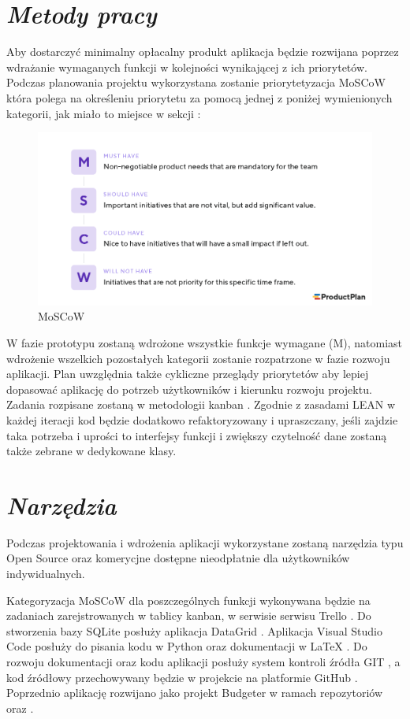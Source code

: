 \documentclass[a4paper,10pt, twoside]{report}
\newcommand{\customstylesection}[1]{\textbf{\textit{#1}}}
\begin{document}
\section{\customstylesection{Metody pracy}}
{Aby dostarczyć minimalny opłacalny produkt \cite{MVP} aplikacja będzie 
rozwijana poprzez wdrażanie wymaganych funkcji w kolejności wynikającej 
z ich priorytetów. Podczas planowania projektu wykorzystana zostanie 
priorytetyzacja MoSCoW \cite{MOSCOW} która polega na określeniu priorytetu za 
pomocą jednej z poniżej wymienionych kategorii, jak miało to miejsce w sekcji 
:
\begin{figure}[H]           %
    \caption{MoSCoW}
    \label{fig:MoSCoW}
    \centering  
    \includegraphics[width=12cm]{figures/MoSCoW-01.png}
\end{figure}
W fazie prototypu zostaną wdrożone wszystkie funkcje wymagane (M), 
natomiast wdrożenie wszelkich pozostałych kategorii zostanie rozpatrzone w fazie
 rozwoju aplikacji. Plan uwzględnia także cykliczne przeglądy priorytetów aby 
 lepiej dopasować aplikację do potrzeb użytkowników i kierunku rozwoju projektu.
 Zadania rozpisane zostaną w metodologii kanban \cite{Kanban}. Zgodnie z 
zasadami LEAN \cite{LEAN} w każdej iteracji kod będzie dodatkowo refaktoryzowany
 i upraszczany, jeśli zajdzie taka potrzeba i uprości to interfejsy funkcji i 
zwiększy czytelność dane zostaną także zebrane w dedykowane klasy.}

\section{\customstylesection{Narzędzia}}
{Podczas projektowania i wdrożenia aplikacji wykorzystane zostaną narzędzia typu
 Open Source oraz komerycjne dostępne nieodpłatnie dla użytkowników 
indywidualnych.}

{Kategoryzacja MoSCoW \cite{MOSCOW} dla poszczególnych funkcji wykonywana będzie
 na zadaniach zarejstrowanych w tablicy kanban, w serwisie serwisu Trello 
\cite{Trello}. Do stworzenia bazy SQLite \cite{SQLite} posłuży aplikacja 
DataGrid \cite{DataGrid}. Aplikacja Visual Studio Code \cite{VSCode} posłuży do
 pisania kodu w Python \cite{Python} oraz dokumentacji w LaTeX \cite{LaTeX}. Do 
rozwoju dokumentacji oraz kodu aplikacji posłuży system kontroli źródła GIT 
\cite{GIT}, a kod źródłowy przechowywany będzie w projekcie \cite[Righten]{GITRighten}
 na platformie GitHub \cite{GitHub}. Poprzednio aplikację rozwijano jako 
 projekt Budgeter w ramach repozytoriów \cite[DatabaseShenanigans]{GITBudgeterApp} 
 oraz \cite[budgeter]{GITBudgeterDoc}.}
\end{document}
